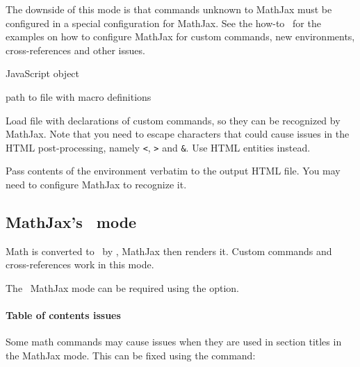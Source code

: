 The downside of this mode is that commands unknown to MathJax must be configured in a special configuration for
MathJax. See the how-to~ for the examples 
on how to configure MathJax for custom commands, new environments, cross-references
and other issues.

 {JavaScript object}\EndDoc




 {path to file with macro definitions}\EndDoc

Load file with declarations of custom commands, so they can be recognized 
by MathJax. Note that you need to escape characters that could cause issues
in the HTML post-processing, namely \verb|<|, \verb|>| and \verb|&|. Use 
HTML entities instead.


Pass contents of the environment verbatim to the output HTML file.
You may need to configure MathJax to recognize it.



\subsection{MathJax's \mathml\ mode}

Math is converted to \mathml\ by \texfourht, MathJax then renders it. Custom
commands and cross-references work in this mode.

The \mathml\ MathJax mode can be required using the  option.

\paragraph{Table of contents issues}

Some math commands may cause issues when they are used in section titles in the MathJax mode. 
This can be fixed using the \texcommand{\fixmathjaxtoc} command:

\begin{texsource}
\fixmathjaxtoc\int
\end{texsource}


